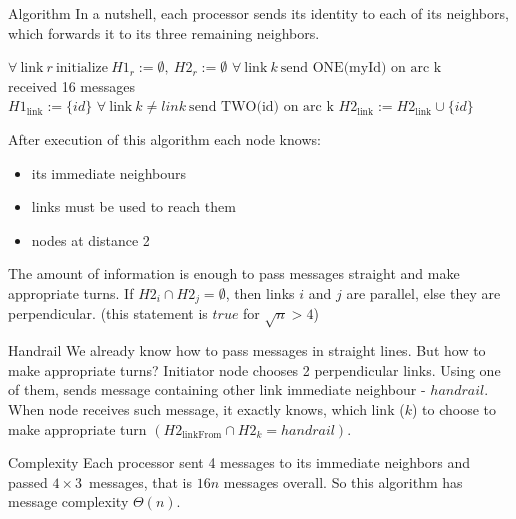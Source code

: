 \documentclass{article}
\begin{document}
\begin{subsection}{Algorithm}
In a nutshell, each processor sends its identity to each of its neighbors, which forwards it to its three remaining neighbors.

\begin{algorithm} 
\caption{Bernard Mans' algorithm for local sense of direction in \textit{tori}}
\begin{algorithmic}
\State $\forall \ \text{link} \ r \ \text{initialize} \ H1_r:=\emptyset,\ H2_r:=\emptyset$
\State $\forall \ \text{link} \ k \ \text{send ONE(myId) on arc k}$
\\
\Repeat
    \State {}
\Until received 16 messages
\\
        \State $H1_\text{link}:=\{id\}$
        \State $\forall \ \text{link} \ k \neq link  \ \text{send TWO(id) on arc k}$
    \EndIf
        \State $H2_\text{link}:=H2_\text{link} \cup \{id\}$    
    \EndIf
\EndProcedure
\end{algorithmic}
\end{algorithm}

\newpage

After execution of this algorithm each node knows:
\begin{itemize}
    \item its immediate neighbours
    \item links must be used to reach them
    \item nodes at distance 2
\end{itemize}
The amount of information is enough to pass messages straight and make appropriate turns. If $H2_i \cap H2_j = \emptyset$, then links $i$ and $j$ are parallel, else they are perpendicular. (this statement is $true$ for $\sqrt{n} > 4$) 

\end{subsection}

\begin{subsection}{Handrail}
We already know how to pass messages in straight lines. But how to make appropriate turns? Initiator node chooses 2 perpendicular links. Using one of them, sends message containing other link immediate neighbour - $handrail$. When node receives such message, it exactly knows, which link  ($k$) to choose to make appropriate turn
$(H2_\text{linkFrom} \cap H2_k = handrail)$.  
\end{subsection}

\begin{subsection}{Complexity}
Each processor sent 4 messages to its immediate neighbors and passed \mbox{$4 \times 3$ messages}, that is $16n$ messages overall. So this algorithm has message complexity $\Theta(n)$. 
\end{subsection}

\printbibliography
\end{document}
